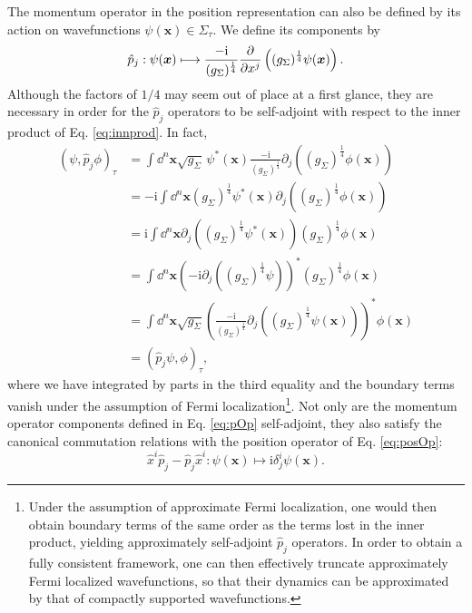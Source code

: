 \documentclass[prd,twocolumn,superscriptaddress,floatfix,amsmath,amssymb,amsfonts,longbibliography,nofootinbib]{revtex4-1}
\newcommand{\ii}{\mathrm{i}}
\begin{document}
The momentum operator in the position representation can also be defined by its action on wavefunctions \mbox{$\psi(\bm x)\in\Sigma_\tau$}. We define its components by
\begin{equation}\label{eq:pOp}
    \hat{p}_j:\psi(\bm x) \longmapsto  \frac{- \ii}{(g_\Sigma)^\frac{1}{4}}\pdv{}{x^j} \left((g_\Sigma)^\frac{1}{4}\psi(\bm x)\right).
\end{equation}
Although the factors of $1/4$ may seem out of place at a first glance, they are necessary in order for the $\hat{p}_j$ operators to be self-adjoint with respect to the inner product of Eq. \eqref{eq:innprod}. In fact,
\begin{align}
    (\psi,\hat{p}_j\phi)_\tau &=  \int\dd^n\bm x \sqrt{g_{\Sigma}}\,\psi^*(\bm x) \frac{-\ii}{(g_\Sigma)^\frac{1}{4}}\partial_j \left((g_\Sigma)^\frac{1}{4}\phi(\bm x)\right)\nonumber\\
    &= -\ii \int \dd^n\bm x(g_\Sigma)^\frac{1}{4} \psi^*(\bm x) \partial_j \left((g_\Sigma)^\frac{1}{4}\phi(\bm x)\right)\nonumber\\
    &= \ii \int \dd^n\bm x\partial_j\left((g_\Sigma)^\frac{1}{4} \psi^*(\bm x)\right) (g_\Sigma)^\frac{1}{4}\phi(\bm x)\nonumber\\
    &= \int \dd^n\bm x\left(-\ii\partial_j\left((g_\Sigma)^\frac{1}{4} \psi\right)\right)^* (g_\Sigma)^\frac{1}{4}\phi(\bm x)\nonumber\\
    &= \int \dd^n\bm x\sqrt{g_{\Sigma}}\left(\frac{-\ii}{(g_\Sigma)^\frac{1}{4}}\partial_j\left((g_\Sigma)^\frac{1}{4} \psi(\bm x)\right)\right)^* \!\!\phi(\bm x) \nonumber\\
    &= (\hat{p}_j \psi,\phi)_\tau,
\end{align}
where we have integrated by parts in the third equality and the boundary terms vanish under the assumption of Fermi localization\footnote{Under the assumption of approximate Fermi localization, one would then obtain boundary terms of the same order as the terms lost in the inner product, yielding approximately self-adjoint $\hat{p}_j$ operators. In order to obtain a fully consistent framework, one can then effectively truncate approximately Fermi localized wavefunctions, so that their dynamics can be approximated by that of compactly supported wavefunctions.}. Not only are the momentum operator components defined in Eq. \eqref{eq:pOp} self-adjoint, they also satisfy the canonical commutation relations with the position operator of Eq. \eqref{eq:posOp}:
\begin{equation}
    \hat{x}^i \hat{p}_j - \hat{p}_j \hat{x}^i : \psi(\bm x) \longmapsto \ii \delta^i_j\psi(\bm x).
\end{equation}
\end{document}
